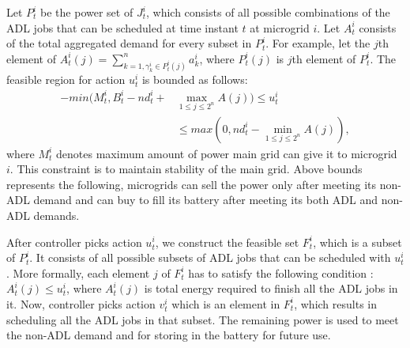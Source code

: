 Let $P_{t}^{i}$ be the power set of $J_{t}^{i}$, which consists of all possible combinations of the ADL jobs that can be scheduled at time instant $t$ at microgrid $i$. Let  $A_{t}^{i}$ consists of the total aggregated demand  for every subset in  $P_{t}^{i}$. For example, let the $j$th element of $A_{t}^{i}(j) = \sum_{k=1, \gamma_k^i \in P_{t}^{i}(j) }^n a_k^i$, where $ P_{t}^{i}(j)$ is $j$th element of  $P_{t}^{i}$.
 The feasible region for action $u_{t}^{i}$ is bounded as follows:
\begin{align}
-min(M_t^i, B_t^i - nd_t^i + &\max_{1\leq j \leq 2^n} A(j) ) \leq u_t^i \nonumber\\ &\leq max(0, nd_t^i - \min_{1\leq j \leq 2^n} A(j)),
\end{align}
where $M_t^i$ denotes maximum amount of power main grid can give it to microgrid $i$. This constraint is to maintain stability of the main grid. Above bounds represents the following, microgrids can sell the power only after meeting its non-ADL demand and can buy to fill its battery after meeting its both ADL and non-ADL demands.

After controller picks action $u_{t}^{i}$, we construct the feasible set $F_{t}^{i}$, which is a subset of $P_{t}^{i}$. It consists of all possible subsets of ADL jobs that can be scheduled with $u_{t}^{i}$. More formally, each element $j$ of  $F_{t}^{i}$ has to satisfy the following condition :   $A_t^i(j) \leq u_{t}^{i} $, where $A_t^i(j)$ is total energy required to finish all the ADL jobs in it. Now, controller picks action $v_{t}^{i}$ which is an element in $F_{t}^{i}$, which results in scheduling all the ADL jobs in that subset. The remaining power is used to meet the non-ADL demand and for storing in the battery for future use.

